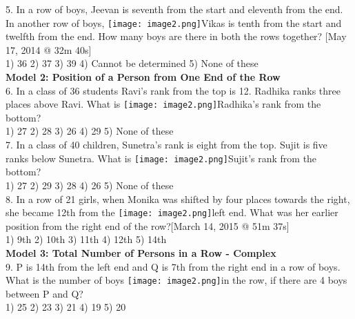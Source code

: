 \documentclass[
]{article}
\begin{document}
5. In a row of boys, Jeevan is seventh from the start and eleventh from the end. In another row of boys, \texttt{[image: image2.png]}Vikas is tenth from the start and twelfth from the end. How many boys are there in both the rows together? [May 17, 2014 @ 32m 40s]\\
1) 36 \hspace{2mm}2) 37 \hspace{2mm}3) 39
\hspace{2mm}4) Cannot be determined \hspace{2mm}5) None of these\\

\textbf{Model 2: Position of a Person from One End of the Row}\\
6. In a class of 36 students Ravi’s rank from the top is 12. Radhika ranks three places above Ravi. What is \texttt{[image: image2.png]}Radhika’s rank from the bottom?\\
1) 27 \hspace{2mm}2) 28 \hspace{2mm}3) 26 \hspace{2mm}4) 29 \hspace{2mm}5) None of these\\

7. In a class of 40 children, Sunetra’s rank is eight from the top. Sujit is five ranks below Sunetra. What is \texttt{[image: image2.png]}Sujit’s rank from the bottom?\\
1) 27 \hspace{2mm}2) 29 \hspace{2mm}3) 28 \hspace{2mm}4) 26 \hspace{2mm}5) None of these\\

8. In a row of 21 girls, when Monika was shifted by four places towards the right, she became 12th from the \texttt{[image: image2.png]}left end. What was her earlier position from the right end of the row?[March 14, 2015 @ 51m 37s]\\
1) 9th \hspace{2mm}2) 10th \hspace{2mm}3) 11th \hspace{2mm}4) 12th \hspace{2mm}5) 14th\\

\textbf{Model 3: Total Number of Persons in a Row - Complex}\\
9. P is 14th from the left end and Q is 7th from the right end in a row of boys. What is the number of boys \texttt{[image: image2.png]}in the row, if there are 4 boys between P and Q?\\
1) 25 \hspace{2mm}2) 23 \hspace{2mm}3) 21 \hspace{2mm}4) 19 \hspace{2mm}5) 20\\
\end{document}
